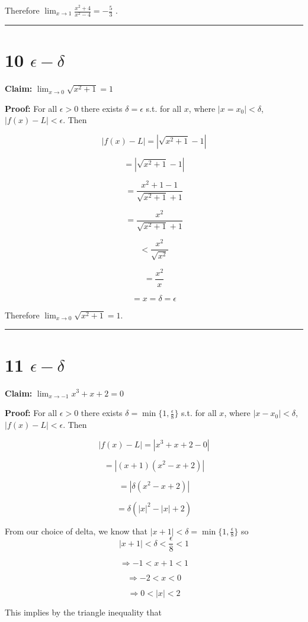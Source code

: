 \documentclass[10pt,letterpaper]{article}
\newcommand\ds{\displaystyle}
\newcommand\qedsym{\hfill \rule{2mm}{2mm}}
\begin{document}
Therefore $\ds\lim_{x\to 1}\frac{x^2+4}{x^2-4} = -\frac{5}{3}$ .

\qedsym

\section*{10 $\epsilon - \delta$}

\textbf{Claim:} $\ds\lim_{x\to 0} \sqrt{x^2 + 1} = 1$

\medskip

\textbf{Proof:} For all $\epsilon > 0$ there exists $\delta = \epsilon$ s.t. for all $x$, where $|x=x_0| < \delta$, $|f(x)-L|<\epsilon$. Then

\[|f(x)-L|=\left|\sqrt{x^2+1}-1\right|\]

\[=\left|\sqrt{x^2+1}-1\right|\]

\[=\frac{x^2+1-1}{\sqrt{x^2+1}+1}\]

\[=\frac{x^2}{\sqrt{x^2+1}+1}\]

\[<\frac{x^2}{\sqrt{x^2}}\]

\[=\frac{x^2}{x}\]

\[=x=\delta=\epsilon\]

Therefore $\ds\lim_{x\to 0} \sqrt{x^2 + 1} = 1$. 

\qedsym

\section*{11 $\epsilon - \delta$}

\textbf{Claim:} $\ds\lim_{x\to -1} x^3 + x + 2 = 0$

\medskip

\textbf{Proof:} For all $\epsilon > 0$ there exists $\delta = \min\{1, \frac{\epsilon}{8}\}$ s.t. for all $x$, where $|x-x_0|<\delta$, $|f(x)-L|<\epsilon$. Then

\[|f(x)-L| = |x^3 + x + 2 - 0|\]

\[=|(x+1)(x^2-x+2)|\]

\[=|\delta (x^2-x+2)|\]

\[=\delta (|x|^2 - |x| + 2)\]

From our choice of delta, we know that $|x+1|<\delta=\min\{1, \frac{\epsilon}{8}\}$ so \[|x+1|<\delta < \frac{\epsilon}{8} < 1\]

\[\Rightarrow -1 < x+1 < 1\]

\[\Rightarrow -2 < x < 0\]

\[\Rightarrow 0 < |x| < 2\]

This implies by the triangle inequality that
\end{document}
